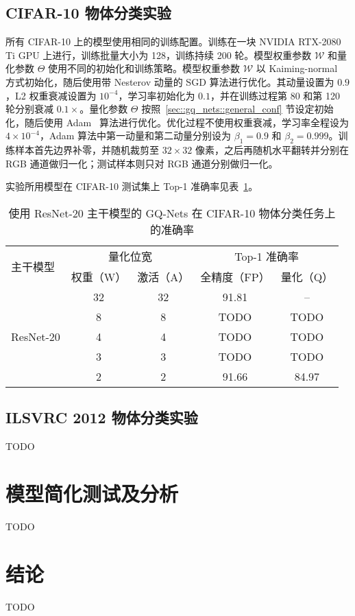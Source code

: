\subsection{CIFAR-10 物体分类实验}
所有 CIFAR-10 上的模型使用相同的训练配置。训练在一块 NVIDIA RTX-2080 Ti GPU 上进行，训练批量大小为 128，训练持续 200 轮。模型权重参数 $\mathcal{W}$ 和量化参数 $\Theta$ 使用不同的初始化和训练策略。模型权重参数 $\mathcal{W}$ 以 Kaiming-normal~\citep{He_2015} 方式初始化，随后使用带 Nesterov 动量的 SGD 算法进行优化。其动量设置为 $0.9$，L2 权重衰减设置为 $10^{-4}$，学习率初始化为 $0.1$，并在训练过程第 80 和第 120 轮分别衰减 $0.1\times$。量化参数 $\Theta$ 按照~\ref{sec::gq_nets::general_conf} 节设定初始化，随后使用 Adam~\citep{kingma2014adam} 算法进行优化。优化过程不使用权重衰减，学习率全程设为 $4\times 10^{-4}$，Adam 算法中第一动量和第二动量分别设为 $\beta_1 = 0.9$ 和 $\beta_2 = 0.999$。训练样本首先边界补零，并随机裁剪至 $32\times 32$ 像素，之后再随机水平翻转并分别在 RGB 通道做归一化；测试样本则只对 RGB 通道分别做归一化。

实验所用模型在 CIFAR-10 测试集上 Top-1 准确率见表~\ref{tab::gq_nets::cifar}。

\begin{table}[htb]
  \centering
  \caption{使用 ResNet-20 主干模型的 GQ-Nets 在 CIFAR-10 物体分类任务上的准确率}
  \label{tab::gq_nets::cifar}
  \begin{tabular}{l *{4}{c}}
    \toprule
    \multirow{2}{*}{主干模型} & \multicolumn{2}{c}{量化位宽} &\multicolumn{2}{c}{Top-1 准确率} \\
    & 权重（W） & 激活（A） & 全精度（FP） & 量化（Q） \\
    \midrule
    \multirow{5}{*}{ResNet-20} & 32 & 32 & 91.81 & -- \\
    & 8 & 8 & TODO & TODO \\
    & 4 & 4 & TODO & TODO \\
    & 3 & 3 & TODO & TODO \\
    & 2 & 2 & 91.66 & 84.97 \\
    \bottomrule
  \end{tabular}
\end{table}
\subsection{ILSVRC 2012 物体分类实验}
TODO
\section{模型简化测试及分析}
TODO

\section{结论}
TODO

